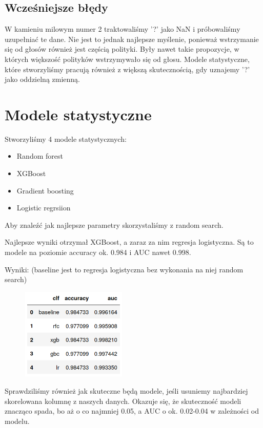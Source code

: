 \documentclass{article}
\begin{document}
\subsection{Wcześniejsze błędy}

W kamieniu milowym numer 2 traktowaliśmy '?' jako NaN i próbowaliśmy uzupełniać te dane. Nie jest to jednak najlepsze myślenie, ponieważ wstrzymanie się od głosów również jest częścią polityki. Były nawet takie propozycje, w których większość polityków wstrzymywało się od głosu. Modele statystyczne, które stworzyliśmy pracują również z większą skutecznością, gdy uznajemy '?' jako oddzielną zmienną. 

\section{Modele statystyczne}

Stworzyliśmy 4 modele statystycznych: 

\begin{itemize}
    \item Random forest
    \item XGBoost
    \item Gradient boosting
    \item Logistic regrsiion
\end{itemize}

Aby znaleźć jak najlepsze parametry skorzystaliśmy z random search. 

Najlepsze wyniki otrzymał XGBoost, a zaraz za nim regresja logistyczna. Są to modele na poziomie accuracy ok. 0.984 i AUC nawet 0.998.

Wyniki: (baseline jest to regresja logistyczna bez wykonania na niej random search)

\begin{figure}[!hb]
\centering
\includegraphics[width=5cm]{zdjecia/tabela.png}
\end{figure}

Sprawdziliśmy również jak skuteczne będą modele, jeśli usuniemy najbardziej skorelowana kolumnę z naszych danych. Okazuje się, że skuteczność modeli znacząco spada, bo aż o co najmniej 0.05, a AUC o ok. 0.02-0.04 w zależności od modelu. 
\end{document}
